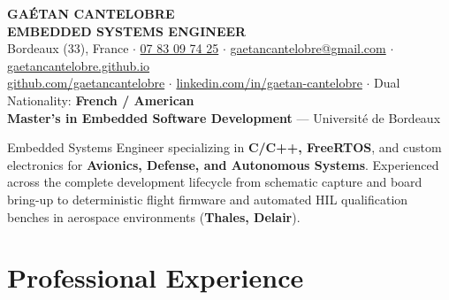\documentclass[10pt,a4paper]{article}
\begin{document}
\begin{center}
    {\huge\textbf{\color{primary}GAÉTAN CANTELOBRE}}\\[2pt]
    {\large\textbf{\color{accent}EMBEDDED SYSTEMS ENGINEER}}\\[4pt]
    \small
    Bordeaux (33), France \quad$\cdot$\quad
    \href{tel:+33783097425}{07 83 09 74 25} \quad$\cdot$\quad
    \href{mailto:gaetancantelobre@gmail.com}{gaetancantelobre@gmail.com} \quad$\cdot$\quad
    \href{https://gaetancantelobre.github.io}{gaetancantelobre.github.io}\\[2pt]
    \href{https://github.com/gaetancantelobre}{github.com/gaetancantelobre} \quad$\cdot$\quad
    \href{https://www.linkedin.com/in/gaetan-cantelobre/}{linkedin.com/in/gaetan-cantelobre} \quad$\cdot$\quad
    Dual Nationality: \textbf{French / American}\\[2pt]
    \textbf{Master’s in Embedded Software Development} --- Université de Bordeaux
\end{center}

\vspace{-4pt}
\small
Embedded Systems Engineer specializing in \textbf{C/C++, FreeRTOS}, and custom electronics for \textbf{Avionics, Defense, and Autonomous Systems}. Experienced across the complete development lifecycle from schematic capture and board bring-up to deterministic flight firmware and automated HIL qualification benches in aerospace environments (\textbf{Thales, Delair}).

\section{Professional Experience}
\end{document}
